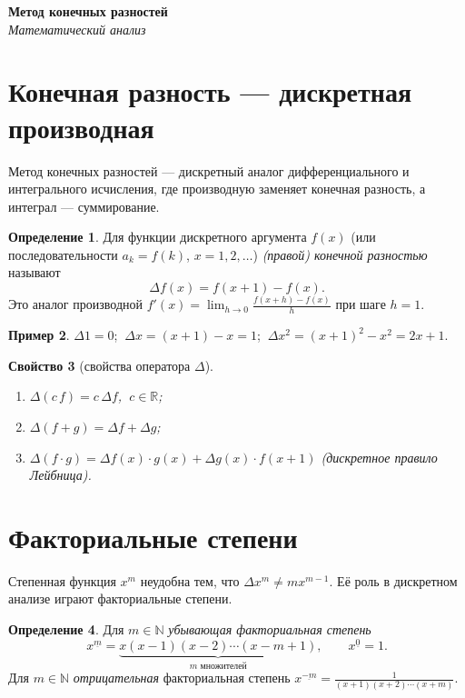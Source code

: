 \documentclass[11pt,a4paper]{article}
\newcommand{\coursename}{Математический анализ}
\newcommand{\doctitle}{Метод конечных разностей}
\theoremstyle{definition}
\newtheorem{definition}{Определение}[section]
\newtheorem{example}[definition]{Пример}
\theoremstyle{plain}
\newtheorem{property}[definition]{Свойство}
\newcommand{\R}{\mathbb{R}}
\newcommand{\N}{\mathbb{N}}
\begin{document}
\begin{center}
  {\LARGE\bfseries \doctitle}\\[4pt]
  {\large\itshape \coursename}
\end{center}
\vspace{6pt}

\section{Конечная разность — дискретная производная}

Метод конечных разностей — дискретный аналог дифференциального и интегрального исчисления, где
производную заменяет конечная разность, а интеграл — суммирование.

\begin{definition}
Для функции дискретного аргумента $f(x)$ (или последовательности $a_k=f(k)$, $x=1,2,\dots$)
\emph{(правой) конечной разностью} называют
\[
  \Delta f(x)=f(x+1)-f(x).
\]
Это аналог производной $f'(x)=\lim_{h\to0}\frac{f(x+h)-f(x)}{h}$ при шаге $h=1$.
\end{definition}

\begin{example}
$\Delta 1=0$; $\ \Delta x=(x+1)-x=1$; $\ \Delta x^2=(x+1)^2-x^2=2x+1$.
\end{example}

\begin{property}[свойства оператора $\Delta$]\leavevmode
\begin{enumerate}[label=\arabic*),leftmargin=*]
  \item $\Delta(c\,f)=c\,\Delta f$, $\ c\in\R$;
  \item $\Delta(f+g)=\Delta f+\Delta g$;
  \item $\Delta(f\cdot g)=\Delta f(x)\cdot g(x)+\Delta g(x)\cdot f(x+1)$ (дискретное правило Лейбница).
\end{enumerate}
\end{property}

\section{Факториальные степени}

Степенная функция $x^m$ неудобна тем, что $\Delta x^m\ne mx^{m-1}$. Её роль в дискретном анализе
играют факториальные степени.

\begin{definition}
Для $m\in\N$ \emph{убывающая факториальная степень}
\[
  x^{\underline{m}}=\underbrace{x(x-1)(x-2)\cdots(x-m+1)}_{m\text{ множителей}},\qquad
  x^{\underline 0}=1 .
\]
Для $m\in\N$ \emph{отрицательная} факториальная степень
$\displaystyle x^{\underline{-m}}=\frac{1}{(x+1)(x+2)\cdots(x+m)}$.
\end{definition}
\end{document}
